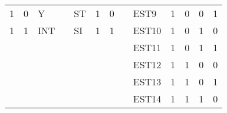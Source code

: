 \begin{longtable}{llllllll|lrrrr|}
\multicolumn{1}{|r|}{\cellcolor[HTML]{CCCCCC}1} & \multicolumn{1}{r|}{\cellcolor[HTML]{CCCCCC}0} & \multicolumn{1}{l|}{\cellcolor[HTML]{CCCCCC}Y} & \multicolumn{1}{l|}{} & \multicolumn{1}{l|}{\cellcolor[HTML]{D9D9D9}ST} & \multicolumn{1}{r|}{\cellcolor[HTML]{D9D9D9}1} & \multicolumn{1}{r|}{\cellcolor[HTML]{D9D9D9}0} &  & \multicolumn{1}{l|}{EST9} & \multicolumn{1}{r|}{1} & \multicolumn{1}{r|}{0} & \multicolumn{1}{r|}{0} & 1 \\ \cline{1-3} \cline{5-7} \cline{9-13}
\multicolumn{1}{|r|}{1} & \multicolumn{1}{r|}{1} & \multicolumn{1}{l|}{INT} & \multicolumn{1}{l|}{} & \multicolumn{1}{l|}{SI} & \multicolumn{1}{r|}{1} & \multicolumn{1}{r|}{1} &  & \multicolumn{1}{l|}{\cellcolor[HTML]{D9D9D9}EST10} & \multicolumn{1}{r|}{\cellcolor[HTML]{D9D9D9}1} & \multicolumn{1}{r|}{\cellcolor[HTML]{D9D9D9}0} & \multicolumn{1}{r|}{\cellcolor[HTML]{D9D9D9}1} & \cellcolor[HTML]{D9D9D9}0 \\ \cline{1-3} \cline{5-7} \cline{9-13}
 &  &  &  &  &  &  &  & \multicolumn{1}{l|}{EST11} & \multicolumn{1}{r|}{1} & \multicolumn{1}{r|}{0} & \multicolumn{1}{r|}{1} & 1 \\ \cline{9-13}
 &  &  &  &  &  &  &  & \multicolumn{1}{l|}{\cellcolor[HTML]{D9D9D9}EST12} & \multicolumn{1}{r|}{\cellcolor[HTML]{D9D9D9}1} & \multicolumn{1}{r|}{\cellcolor[HTML]{D9D9D9}1} & \multicolumn{1}{r|}{\cellcolor[HTML]{D9D9D9}0} & \cellcolor[HTML]{D9D9D9}0 \\ \cline{9-13}
 &  &  &  &  &  &  &  & \multicolumn{1}{l|}{EST13} & \multicolumn{1}{r|}{1} & \multicolumn{1}{r|}{1} & \multicolumn{1}{r|}{0} & 1 \\ \cline{9-13}
 &  &  &  &  &  &  &  & \multicolumn{1}{l|}{\cellcolor[HTML]{D9D9D9}EST14} & \multicolumn{1}{r|}{\cellcolor[HTML]{D9D9D9}1} & \multicolumn{1}{r|}{\cellcolor[HTML]{D9D9D9}1} & \multicolumn{1}{r|}{\cellcolor[HTML]{D9D9D9}1} & \cellcolor[HTML]{D9D9D9}0 \\ \cline{9-13}

\end{longtable}
